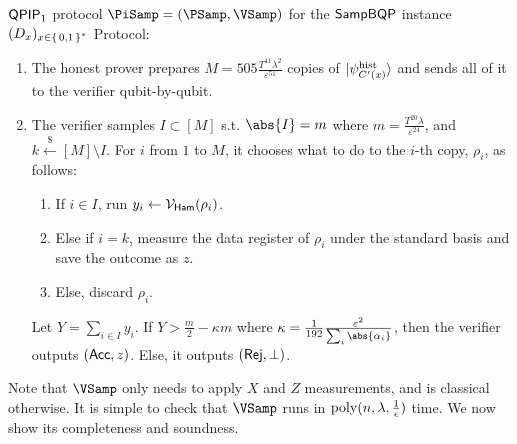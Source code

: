 \begin{protocol}{$\operatorname{\mathsf{QPIP}}_1$ protocol $\PiSamp=(\PSamp, \VSamp)$ for the $\operatorname{\mathsf{SampBQP}}$ instance $(D_x)_{x\in\set{0, 1}^*}$}
	Protocol:
	\begin{enumerate}
		\item\label{step:qpip1-state-gen} The honest prover prepares $M=505\frac{T^{41}\lambda^2}{\varepsilon^{51}}$ copies  of $\ket{\psi_{C'(x)}^{\mathrm{hist}}}$ and sends all of it to the verifier qubit-by-qubit.
		\item\label{step:qpip1-verify} The verifier samples $I\subset[M]$ s.t. $\abs{I}=m$ where $m=\frac{T^{20}\lambda}{\varepsilon^{24}}$, and $k\xleftarrow{\$}[M]\setminus I$.
			For $i$ from $1$ to $M$, it chooses what to do to the $i$-th copy, $\rho_i$, as follows:
		\begin{enumerate}
			\item If $i\in I$, run $y_i\leftarrow\mathcal{V}_{\mathsf{Ham}}(\rho_i)$.
			\item Else if $i=k$, measure the data register    of $\rho_i$ under the standard basis and save the outcome as $z$.
			\item Else, discard $\rho_i$.
		\end{enumerate}
			Let $Y=\sum_{i\in I} y_i$. If $Y>\frac{m}{2}-\kappa m$ where $\kappa=\frac{1}{192}\frac{\varepsilon^2}{\sum_i\abs{\alpha_i}}$, then the verifier outputs $(\mathsf{Acc}, z)$.
			Else, it outputs $(\mathsf{Rej}, \bot)$.
	\end{enumerate}
\end{protocol}

Note that $\VSamp$ only needs to apply $X$ and $Z$ measurements, and is classical otherwise.
It is simple to check that $\VSamp$ runs in $\operatorname*{\operatorname{poly}}(n, \lambda, \frac{1}{\epsilon})$ time.
We now show its completeness and soundness.
  
